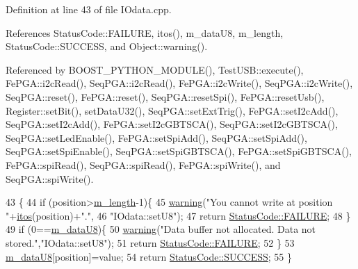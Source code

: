 Definition at line 43 of file I\+Odata.\+cpp.



References Status\+Code\+::\+F\+A\+I\+L\+U\+RE, itos(), m\+\_\+data\+U8, m\+\_\+length, Status\+Code\+::\+S\+U\+C\+C\+E\+SS, and Object\+::warning().



Referenced by B\+O\+O\+S\+T\+\_\+\+P\+Y\+T\+H\+O\+N\+\_\+\+M\+O\+D\+U\+L\+E(), Test\+U\+S\+B\+::execute(), Fe\+P\+G\+A\+::i2c\+Read(), Seq\+P\+G\+A\+::i2c\+Read(), Fe\+P\+G\+A\+::i2c\+Write(), Seq\+P\+G\+A\+::i2c\+Write(), Seq\+P\+G\+A\+::reset(), Fe\+P\+G\+A\+::reset(), Seq\+P\+G\+A\+::reset\+Spi(), Fe\+P\+G\+A\+::reset\+Usb(), Register\+::set\+Bit(), set\+Data\+U32(), Seq\+P\+G\+A\+::set\+Ext\+Trig(), Fe\+P\+G\+A\+::set\+I2c\+Add(), Seq\+P\+G\+A\+::set\+I2c\+Add(), Fe\+P\+G\+A\+::set\+I2c\+G\+B\+T\+S\+C\+A(), Seq\+P\+G\+A\+::set\+I2c\+G\+B\+T\+S\+C\+A(), Seq\+P\+G\+A\+::set\+Led\+Enable(), Fe\+P\+G\+A\+::set\+Spi\+Add(), Seq\+P\+G\+A\+::set\+Spi\+Add(), Seq\+P\+G\+A\+::set\+Spi\+Enable(), Seq\+P\+G\+A\+::set\+Spi\+G\+B\+T\+S\+C\+A(), Fe\+P\+G\+A\+::set\+Spi\+G\+B\+T\+S\+C\+A(), Fe\+P\+G\+A\+::spi\+Read(), Seq\+P\+G\+A\+::spi\+Read(), Fe\+P\+G\+A\+::spi\+Write(), and Seq\+P\+G\+A\+::spi\+Write().


\begin{DoxyCode}
43                                                             \{
44   \textcolor{keywordflow}{if} (position>\hyperlink{classIOdata_afabe57441da019eb614d277799106aac}{m\_length}-1)\{
45     \hyperlink{classObject_a65cd4fda577711660821fd2cd5a3b4c9}{warning}(\textcolor{stringliteral}{"You cannot write at position "}+\hyperlink{Tools_8h_af330027dbdafb9a30768b3613c553e60}{itos}(position)+\textcolor{stringliteral}{"."},
46         \textcolor{stringliteral}{"IOdata::setU8"});
47     \textcolor{keywordflow}{return} \hyperlink{classStatusCode_a6f565cbeadc76d14c72f047e5e85eb4ba3da73d4c469762eb9d3c960368252b26}{StatusCode::FAILURE};
48   \}
49   \textcolor{keywordflow}{if} (0==\hyperlink{classIOdata_a9c4c0dc5104f7f3b170e30ab78fe61e7}{m\_dataU8})\{
50     \hyperlink{classObject_a65cd4fda577711660821fd2cd5a3b4c9}{warning}(\textcolor{stringliteral}{"Data buffer not allocated. Data not stored."},\textcolor{stringliteral}{"IOdata::setU8"});
51     \textcolor{keywordflow}{return} \hyperlink{classStatusCode_a6f565cbeadc76d14c72f047e5e85eb4ba3da73d4c469762eb9d3c960368252b26}{StatusCode::FAILURE};
52   \}
53   \hyperlink{classIOdata_a9c4c0dc5104f7f3b170e30ab78fe61e7}{m\_dataU8}[position]=value;
54   \textcolor{keywordflow}{return} \hyperlink{classStatusCode_a6f565cbeadc76d14c72f047e5e85eb4badd0da38d3ba0d922efd1f4619bc37ad8}{StatusCode::SUCCESS};
55 \}
\end{DoxyCode}
\mbox{\label{classIOdata_a20f30a9f4673713616447b1b5e9817d5}} 
